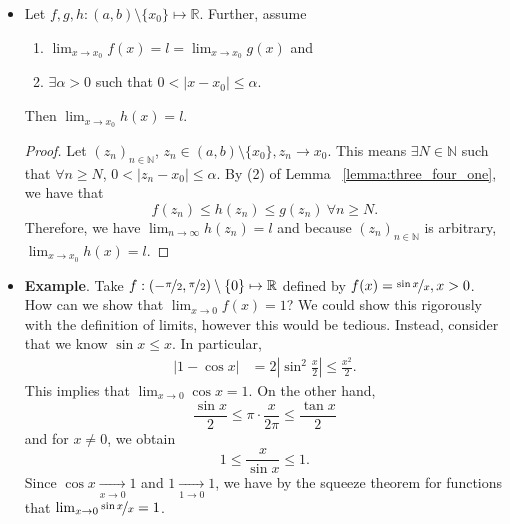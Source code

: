 \documentclass{article}
\newcommand{\R}{\mathbb{R}}
\newcommand{\N}{\mathbb{N}}
\newcommand{\seq}[2]{(#1_{#2})_{#2 \in \N}}
\newcommand{\?}{\stackrel{?}{=}}
\theoremstyle{definition} %
\begin{document}
\begin{itemize}
\begin{proof}
    \end{proof}
    \item[]
    \begin{theorem}
        Let $f, g, h: (a, b) \setminus \{x_0\} \mapsto \R$. Further, assume
        \begin{enumerate}[label=(\arabic*)]
            \item $\lim_{x \to x_0} f(x) = l = \lim_{x \to x_0} g(x)$ and
            \item $\exists \alpha > 0$ such that $0 < |x - x_0| \leq \alpha$.
        \end{enumerate}
        Then $\lim_{x \to x_0} h(x) = l$.
    \end{theorem}
    \begin{proof}
        Let $\seq{z}{n}$, $z_n \in (a, b) \setminus \{x_0\}, z_n \rightarrow x_0$. This means $\exists N \in \N$ such that $\forall n \geq N$, $0 < |z_n - x_0| \leq \alpha$. By (2) of Lemma ~\ref{lemma:three_four_one}, we have that $$f(z_n) \leq h(z_n) \leq g(z_n) \ \forall n \geq N.$$
        Therefore, we have $\lim_{n \to \infty} h(z_n) = l$ and because $\seq{z}{n}$ is arbitrary, $\lim_{x \to x_0} h(x) = l$.
    \end{proof}
    \item \textbf{Example}. Take $f: (-\nicefrac{\pi}{2}, \nicefrac{\pi}{2}) \setminus \{0\} \mapsto \R$ defined by $f(x) = \nicefrac{\sin x}{x}, x > 0$. How can we show that $\lim_{x \to 0} f(x) = 1$? We could show this rigorously with the definition of limits, however this would be tedious. Instead, consider that we know $\sin x \leq x$. In particular,
    \begin{align*}
        |1 - \cos x| &= 2\left|\sin^2 \frac{x}{2}\right| \leq \frac{x^2}{2}.
    \end{align*}
    This implies that $\lim_{x \to 0} \cos x = 1$. On the other hand,
    $$\frac{\sin x}{2} \leq \pi \cdot \frac{x}{2\pi} \leq \frac{\tan x}{2}$$
    and for $x \neq 0$, we obtain
    $$1 \leq \frac{x}{\sin x} \leq 1.$$
    Since $\cos x \underset{x \to 0}{\longrightarrow} 1$ and $1 \underset{1 \to 0}{\longrightarrow} 1$, we have by the squeeze theorem for functions that $\lim_{x \to 0} \nicefrac{\sin x}{x} = 1$.
\end{itemize}

\newpage

\listoftheorems[]
 
\end{document}
